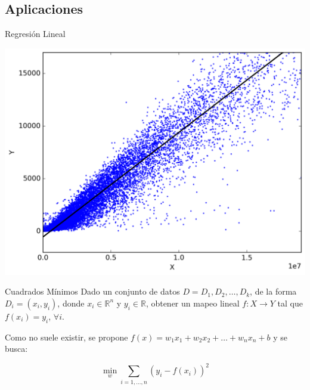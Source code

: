 \documentclass[12pt,aspectratio=169]{beamer}
\begin{document}
\subsection{Aplicaciones}
\begin{frame}{Regresión Lineal}
	\begin{center}
	\includegraphics[width=.6\paperwidth]{regression.png}
	\end{center}
\end{frame}

\begin{frame}{Cuadrados Mínimos}
Dado un conjunto de datos $D = {D_1, D_2, \dots, D_k}$, de la forma $D_i = (x_i, y_i)$, donde $x_i \in \mathbb{R}^n$ y $y_i \in \mathbb{R}$, obtener un mapeo lineal $f: X \rightarrow Y$ tal que $f(x_i) = y_i$, $\forall i$.

Como no suele existir, se propone $f(x) = w_1x_1 + w_2x_2 + \dots + w_nx_n + b$ y se busca:

$$
\min_w \sum_{i=1,\dots,n}(y_i - f(x_i))^2
$$

\end{frame}
\end{document}
